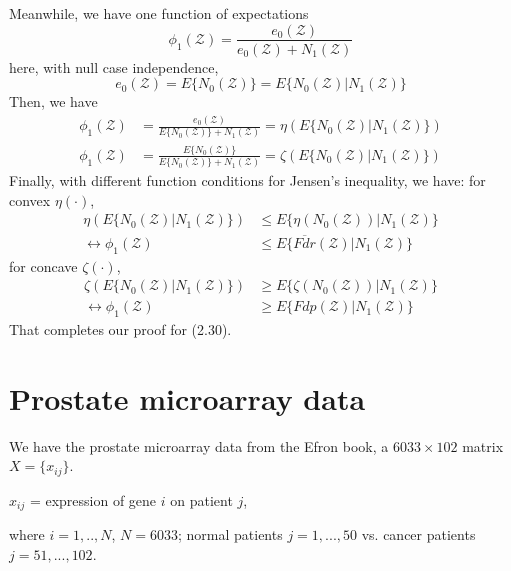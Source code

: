 \documentclass{article}
\begin{document}
\subsubsection*{}
Meanwhile, we have one function of expectations
\begin{displaymath}
\phi_1(\mathcal{Z}) = \frac{e_0(\mathcal{Z})}{e_0(\mathcal{Z}) + N_1(\mathcal{Z})}
\end{displaymath}
here, with null case independence,
\begin{displaymath}
e_0(\mathcal{Z}) = E\{ N_0(\mathcal{Z}) \} = E\{ N_0(\mathcal{Z}) | N_1(\mathcal{Z})\}
\end{displaymath}
Then, we have
\begin{displaymath}
\begin{split}
\phi_1(\mathcal{Z}) &= \frac{e_0(\mathcal{Z})}{E\{N_0(\mathcal{Z})\} +  N_1(\mathcal{Z})} 
= \eta(E\{N_0(\mathcal{Z}) | N_1(\mathcal{Z})\}) \\
\phi_1(\mathcal{Z}) &= \frac{E\{N_0(\mathcal{Z})\}}{E\{N_0(\mathcal{Z})\} +  N_1(\mathcal{Z})} 
= \zeta(E\{N_0(\mathcal{Z}) | N_1(\mathcal{Z})\})
\end{split}
\end{displaymath}
Finally, with different function conditions for Jensen's inequality,
we have:\newline
for convex $\eta(\cdot)$,
\begin{displaymath}
\begin{split}
\eta(E\{N_0(\mathcal{Z}) | N_1(\mathcal{Z})\}) &\leq E\{\eta(N_0(\mathcal{Z})) | N_1(\mathcal{Z}) \} \\
\leftrightarrow
\phi_1(\mathcal{Z}) &\leq E\{\overline{Fdr}(\mathcal{Z}) | N_1(\mathcal{Z})\} 
\end{split}
\end{displaymath}
for concave $\zeta(\cdot)$,
\begin{displaymath}
\begin{split}
\zeta(E\{N_0(\mathcal{Z}) | N_1(\mathcal{Z})\}) &\geq E\{\zeta(N_0(\mathcal{Z})) | N_1(\mathcal{Z}) \} \\
\leftrightarrow
\phi_1(\mathcal{Z}) &\geq E\{Fdp(\mathcal{Z}) | N_1(\mathcal{Z})\} 
\end{split}
\end{displaymath}
That completes our proof for (2.30).







\newpage
\section*{Prostate microarray data}
\hspace{12 pt} We have the prostate microarray data from the Efron
book, a $6033 \times 102$ matrix $X=\{x_{ij}\}$.
\begin{center}
$x_{ij}$ = expression of gene $i$ on patient $j$, 
\end{center}
where $i=1,..,N$, $N=6033$; normal patients $j=1,...,50$ vs. cancer
patients $j=51,...,102$.
\end{document}
